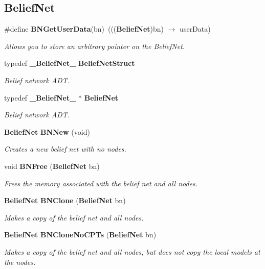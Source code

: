 \subsection*{Belief\-Net}
\begin{CompactItemize}
\item 
\#define {\bf BNGet\-User\-Data}(bn)\ ((({\bf Belief\-Net})bn) $\rightarrow$ user\-Data)
\begin{CompactList}\small\item\em Allows you to store an arbitrary pointer on the Belief\-Net. \item\end{CompactList}\item 
typedef {\bf \_\-Belief\-Net\_\-} {\bf Belief\-Net\-Struct}
\begin{CompactList}\small\item\em Belief network ADT. \item\end{CompactList}\item 
typedef {\bf \_\-Belief\-Net\_\-} $\ast$ {\bf Belief\-Net}
\begin{CompactList}\small\item\em Belief network ADT. \item\end{CompactList}\item 
{\bf Belief\-Net} {\bf BNNew} (void)
\begin{CompactList}\small\item\em Creates a new belief net with no nodes. \item\end{CompactList}\item 
void {\bf BNFree} ({\bf Belief\-Net} bn)
\begin{CompactList}\small\item\em Frees the memory associated with the belief net and all nodes. \item\end{CompactList}\item 
{\bf Belief\-Net} {\bf BNClone} ({\bf Belief\-Net} bn)
\begin{CompactList}\small\item\em Makes a copy of the belief net and all nodes. \item\end{CompactList}\item 
{\bf Belief\-Net} {\bf BNClone\-No\-CPTs} ({\bf Belief\-Net} bn)
\begin{CompactList}\small\item\em Makes a copy of the belief net and all nodes, but does not copy the local models at the nodes. \item\end{CompactList}\item 

\end{CompactItemize}
